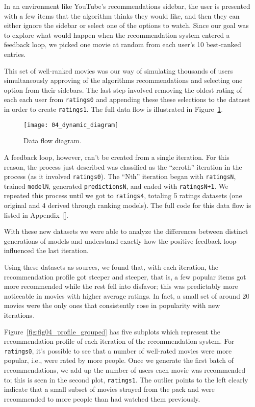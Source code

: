 In an environment like YouTube's recommendations sidebar, the user is presented
with a few items that the algorithm thinks they would like, and then they can
either ignore the sidebar or select one of the options to watch. Since our goal
was to explore what would happen when the recommendation system entered a
feedback loop, we picked one movie at random from each user's 10 best-ranked
entries.

This set of well-ranked movies was our way of simulating thousands of users
simultaneously approving of the algorithms recommendations and selecting one
option from their sidebars. The last step involved removing the oldest rating of
each each user from \verb|ratings0| and appending these these selections to the
dataset in order to create \verb|ratings1|. The full data flow is illustrated
in Figure~\ref{fig:fig04_dynamic_diagram}.

\begin{figure}
  \centering
  \texttt{[image: 04\_dynamic\_diagram]}
  \caption{Data flow diagram.\label{fig:fig04_dynamic_diagram}}
\end{figure}


A feedback loop, however, can't be created from a single iteration. For this
reason, the process just described was classified as the ``zeroth'' iteration in
the process (as it involved \verb|ratings0|). The ``Nth'' iteration began with
\verb|ratingsN|, trained \verb|modelN|, generated \verb|predictionsN|, and ended
with \verb|ratingsN+1|. We repeated this process until we got to
\verb|ratings4|, totaling 5 ratings datasets (one original and 4 derived through
ranking models). The full code for this data flow is listed in Appendix~\ref{}.

With these new datasets we were able to analyze the differences between distinct
generations of models and understand exactly how the positive feedback loop
influenced the last iteration.

Using these datasets as sources, we found that, with each iteration, the
recommendation profile got steeper and steeper, that is, a few popular items got
more recommended while the rest fell into disfavor; this was predictably more
noticeable in movies with higher average ratings. In fact, a small set of around
20 movies were the only ones that consistently rose in popularity with new
iterations.

Figure~\ref{fig:fig04_profile_grouped} has five subplots which represent the
recommendation profile of each iteration of the recommendation system. For
\verb|ratings0|, it's possible to see that a number of well-rated movies were
more popular, i.e., were rated by more people. Once we generate the first batch
of recommendations, we add up the number of users each movie was recommended to;
this is seen in the second plot, \verb|ratings1|. The outlier points to the left
clearly indicate that a small subset of movies strayed from the pack and were
recommended to more people than had watched them previously.

